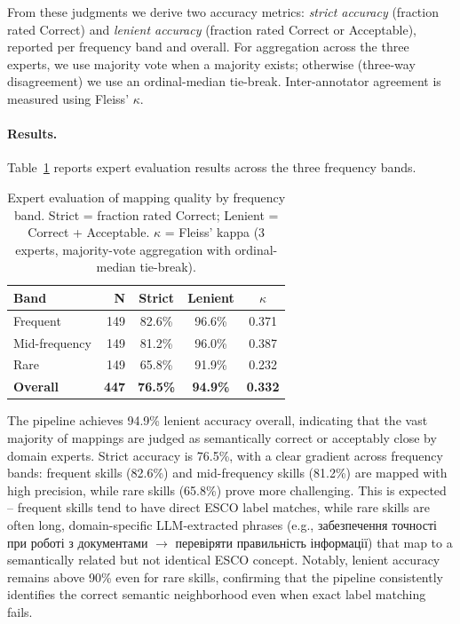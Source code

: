 \documentclass[11pt]{article}
\newcommand{\uk}[1]{{\fontencoding{T2A}\selectfont #1}}
\begin{document}
From these judgments we derive two accuracy metrics: \emph{strict accuracy} (fraction rated Correct) and \emph{lenient accuracy} (fraction rated Correct or Acceptable), reported per frequency band and overall. For aggregation across the three experts, we use majority vote when a majority exists; otherwise (three-way disagreement) we use an ordinal-median tie-break. Inter-annotator agreement is measured using Fleiss' $\kappa$.

\paragraph{Results.} Table~\ref{tab:expert-eval} reports expert evaluation results across the three frequency bands.

\begin{table}[h]
\centering
\small
\begin{tabular}{@{}lrccc@{}}
\toprule
\textbf{Band} & \textbf{N} & \textbf{Strict} & \textbf{Lenient} & \textbf{$\kappa$} \\
\midrule
Frequent & 149 & 82.6\% & 96.6\% & 0.371 \\
Mid-frequency & 149 & 81.2\% & 96.0\% & 0.387 \\
Rare & 149 & 65.8\% & 91.9\% & 0.232 \\
\midrule
\textbf{Overall} & \textbf{447} & \textbf{76.5\%} & \textbf{94.9\%} & \textbf{0.332} \\
\bottomrule
\end{tabular}
\caption{Expert evaluation of mapping quality by frequency band. Strict = fraction rated Correct; Lenient = Correct + Acceptable. $\kappa$ = Fleiss' kappa (3 experts, majority-vote aggregation with ordinal-median tie-break).}
\label{tab:expert-eval}
\end{table}

The pipeline achieves 94.9\% lenient accuracy overall, indicating that the vast majority of mappings are judged as semantically correct or acceptably close by domain experts. Strict accuracy is 76.5\%, with a clear gradient across frequency bands: frequent skills (82.6\%) and mid-frequency skills (81.2\%) are mapped with high precision, while rare skills (65.8\%) prove more challenging. This is expected -- frequent skills tend to have direct ESCO label matches, while rare skills are often long, domain-specific LLM-extracted phrases (e.g., \uk{забезпечення точності при роботі з документами} $\to$ \uk{перевіряти правильність інформації}) that map to a semantically related but not identical ESCO concept. Notably, lenient accuracy remains above 90\% even for rare skills, confirming that the pipeline consistently identifies the correct semantic neighborhood even when exact label matching fails.
\end{document}

